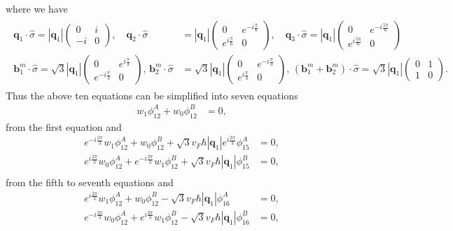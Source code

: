 \documentclass[10pt, oneside]{article}
\newcommand{\p}[1]{\left(#1\right)}
\newcommand{\bv}[1]{\left|#1\right|}
\begin{document}
where we have 
\begin{align}
	\begin{split}
		\bm{q}_1 \cdot \hat{\sigma} = \bv{\bm{q}_1}\begin{pmatrix}
			0 & i \\ -i & 0
		\end{pmatrix},\quad \bm{q}_2 \cdot \hat{\sigma} &= \bv{\bm{q}_1} \begin{pmatrix}
			0 & e^{-i \frac{\pi}{6}} \\ e^{i \frac{\pi}{6}} & 0
		\end{pmatrix},\quad \bm{q}_3 \cdot \hat{\sigma} = \bv{\bm{q}_1} \begin{pmatrix}
			0 & e^{-i \frac{5\pi}{6}} \\ e^{i \frac{5\pi}{6}} & 0 
		\end{pmatrix} \\
		\bm{b}_{1}^{m} \cdot \hat{\sigma}  = \sqrt{3} \bv{\bm{q}_1} \begin{pmatrix}
			0 & e^{i \frac{\pi}{3}} \\ e^{- i \frac{\pi}{3}} & 0
		\end{pmatrix} ,\, \bm{b}_{2}^{m} \cdot \hat{\sigma} & = \sqrt{3} \bv{\bm{q}_1}  \begin{pmatrix}
			0 & e^{ - i \frac{\pi}{3}} \\ e^{i \frac{\pi}{3}} & 0
		\end{pmatrix}, \, \p{\bm{b}_{1}^{m} + \bm{b}_{2}^{m}} \cdot \hat{\sigma} =  \sqrt{3} \bv{\bm{q}_1} \begin{pmatrix}
			0 & 1 \\ 1 & 0
		\end{pmatrix}.
	\end{split}
\end{align}
Thus the above ten equations can be simplified into seven equations
\begin{align}
		w_1 \phi_{12}^{A} + w_0 \phi_{12}^{B} & = 0,
\end{align}
from the first equation and 
\begin{align}
	e^{ - i \frac{2 \pi}{3}} w_1 \phi_{12}^{A} + w_0 \phi_{12}^{B} + \sqrt{3} v_F \hbar \left|\bm{q}_1\right| e^{i \frac{ 2 \pi}{3}} \phi_{15}^{A} & = 0, \\
	e^{i \frac{2 \pi}{3}} w_0 \phi_{12}^{A} + e^{ - i \frac{2 \pi}{3}} w_1 \phi_{12}^{B} + \sqrt{3} v_F \hbar \left|\bm{q}_1\right| \phi_{15}^{B} & = 0, \\
\end{align}
from the fifth to seventh equations and
\begin{align}
	e^{i \frac{2 \pi}{3}} w_1 \phi_{12}^{A} + w_0 \phi_{12}^{B} - \sqrt{3} v_F \hbar \left|\bm{q}_1\right| \phi_{16}^{A} & = 0, \\
	e^{ -i \frac{2 \pi}{3}} w_0 \phi_{12}^{A} + e^{  i \frac{2 \pi}{3}} w_1 \phi_{12}^{B} - \sqrt{3} v_F \hbar \left|\bm{q}_1\right| \phi_{16}^{B} & = 0,\\
\end{align}
\end{document}
